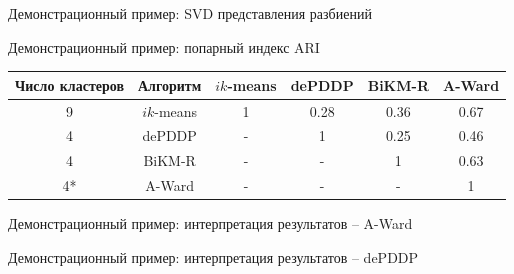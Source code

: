 \documentclass[aspectratio=169,tikz]{beamer}
\newcommand{\AWard}{\mbox{A-Ward}\xspace}
\newcommand{\BiKMR}{\mbox{BiKM-R}\xspace}
\newcommand{\dePDDP}{dePDDP\xspace}
\newcommand{\ikmeans}{\mbox{$ ik $-means}\xspace}
\begin{document}
\begin{frame}{Демонстрационный пример: SVD представления разбиений}
	\end{frame}


	\begin{frame}{Демонстрационный пример: попарный индекс ARI}
	\begin{table}[]
		\centering
		\begin{tabular}{|c|c|c|c|c|c|}
			\hline
			Число кластеров & Алгоритм & \ikmeans & \dePDDP & \BiKMR & \AWard \\ 
			\hline
			9 & \ikmeans  & 1 & 0.28 & 0.36  & 0.67  \\ 
			\hline
			4  & \dePDDP  & - & 1 & 0.25 & 0.46 \\ 
			\hline
			4   & \BiKMR  & - & - & 1 & 0.63 \\ 
			\hline
			4*   & \AWard & - & - & - & 1\\
			\hline
		\end{tabular} 
	\end{table}
	\end{frame}


	\begin{frame}{Демонстрационный пример: интерпретация результатов -- \AWard}
	\begin{figure}[h] %
		\centering
		
	\end{figure}		
	\end{frame}

	\begin{frame}{Демонстрационный пример: интерпретация результатов -- \dePDDP}
	\begin{figure}[h] %
		\centering
		
	\end{figure}		
	\end{frame}
\end{document}
